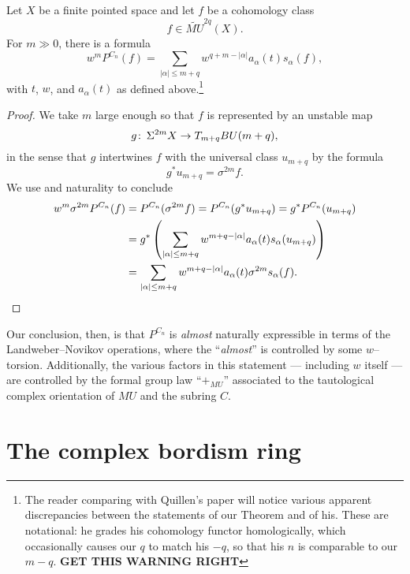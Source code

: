 \begin{theorem}\label{QuillensKeyRelation}
Let $X$ be a finite pointed space and let $f$ be a cohomology class \[f \in \widetilde{MU}^{2q}(X).\]  For $m \gg 0$, there is a formula \[w^m P^{C_n}(f) = \sum_{|\alpha| \le m+q} w^{q+m - |\alpha|} a_\alpha(t) s_\alpha(f),\] with $t$, $w$, and $a_\alpha(t)$ as defined above.\footnote{The reader comparing with Quillen's paper will notice various apparent discrepancies between the statements of our Theorem and of his.  These are notational: he grades his cohomology functor homologically, which occasionally causes our $q$ to match his $-q$, so that his $n$ is comparable to our $m-q$.  \textbf{GET THIS WARNING RIGHT}}
\end{theorem}
\begin{proof}
We take $m$ large enough so that $f$ is represented by an unstable map \[g\colon\thinspace \Sigma^{2m} X \to T_{m+q} BU(m+q),\] in the sense that $g$ intertwines $f$ with the universal class $u_{m+q}$ by the formula \[g^* u_{m+q} = \sigma^{2m} f.\]  We use  and naturality to conclude
\begin{align*}
w^m \sigma^{2m} P^{C_n}(f) & = P^{C_n}(\sigma^{2m} f) = P^{C_n}(g^* u_{m+q}) = g^* P^{C_n}(u_{m+q}) \\
& = g^* \left(\sum_{|\alpha| \le m+q} w^{m+q - |\alpha|} a_\alpha(t) s_\alpha(u_{m+q}) \right) \\
& = \sum_{|\alpha| \le m+q} w^{m+q - |\alpha|} a_\alpha(t) \sigma^{2m} s_\alpha(f). \qedhere
\end{align*}
\end{proof}

Our conclusion, then, is that $P^{C_n}$ is \emph{almost} naturally expressible in terms of the Landweber--Novikov operations, where the ``\emph{almost}'' is controlled by some $w$--torsion.  Additionally, the various factors in this statement --- including $w$ itself --- are controlled by the formal group law ``$+_{MU}$'' associated to the tautological complex orientation of $MU$ and the subring $C$.











\section{The complex bordism ring}

